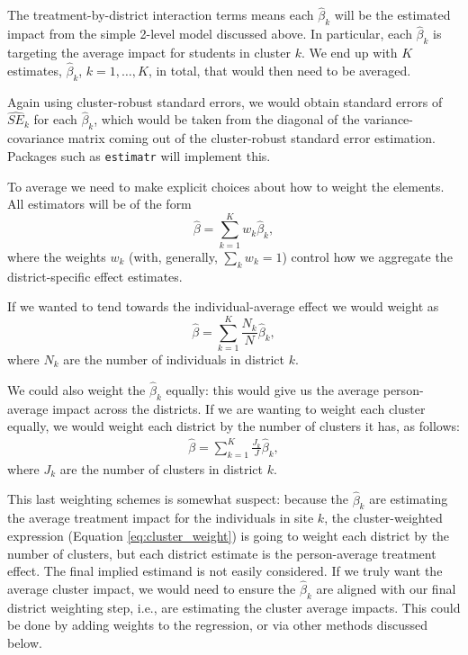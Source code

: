 \documentclass[12pt]{article}
\begin{document}
The treatment-by-district interaction terms means each $\hat{\beta}_k$ will be the estimated impact from the simple 2-level model discussed above.
In particular, each $\hat{\beta}_k$ is targeting the average impact for students in cluster $k$.
We end up with $K$ estimates, $\hat{\beta}_k$, $k=1,\ldots,K$, in total, that would then need to be averaged.

Again using cluster-robust standard errors, we would obtain standard errors of $\widehat{SE}_k$ for each $\hat{\beta}_k$, which would be taken from the diagonal of the variance-covariance matrix coming out of the cluster-robust standard error estimation.
Packages such as \texttt{estimatr} \citep{estimatr} will implement this.

To average we need to make explicit choices about how to weight the elements.
All estimators will be of the form
\[
\hat{\beta} = \sum_{k=1}^K w_k \hat{\beta}_{k} ,
\]
where the weights $w_k$ (with, generally, $\sum_k w_k = 1$) control how we aggregate the district-specific effect estimates.


If we wanted to tend towards the individual-average effect we would weight as
\[
\hat{\beta} = \sum_{k=1}^K \frac{N_k}{N} \hat{\beta}_{k} ,
\] where $N_k$ are the number of individuals in district $k$.

We could also weight the $\hat{\beta}_k$ equally: this would give us the average person-average impact across the districts.
If we are wanting to weight each cluster equally, we would weight each district by the number of clusters it has, as follows:
\begin{align}
\hat{\beta} = \sum_{k=1}^K \frac{J_k}{J} \hat{\beta}_{k}, \label{eq:cluster_weight}
\end{align}
where $J_k$ are the number of clusters in district $k$.

This last weighting schemes is somewhat suspect: because the $\hat{\beta}_k$ are estimating the average treatment impact for the individuals in site $k$, the cluster-weighted expression (Equation \ref{eq:cluster_weight}) is going to weight each district by the number of clusters, but each district estimate is the person-average treatment effect.
The final implied estimand is not easily considered.
If we truly want the average cluster impact, we would need to ensure the $\hat{\beta}_k$ are aligned with our final district weighting step, i.e., are estimating the cluster average impacts.
This could be done by adding weights to the regression, or via other methods discussed below.
\end{document}
